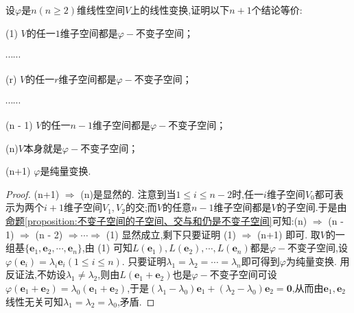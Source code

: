 \documentclass[../../main.tex]{subfiles}%
\begin{document}
\begin{proposition}\label{proposition:纯量变换关于不变子空间的等价条件}
设\(\varphi\)是\(n(n\geqslant  2)\)维线性空间\(V\)上的线性变换,证明以下\(n+1\)个结论等价:

(1) \(V\)的任一\(1\)维子空间都是\(\varphi -\)不变子空间；

\(\cdots\cdots\)

(r) \(V\)的任一\(r\)维子空间都是\(\varphi -\)不变子空间；

\(\cdots\cdots\)

(n - 1) \(V\)的任一\(n - 1\)维子空间都是\(\varphi -\)不变子空间；

(n)\(V\)本身就是\(\varphi -\)不变子空间；

(n+1) \(\varphi\)是纯量变换.
\end{proposition}
\begin{proof}

(n+1) \(\Rightarrow\) (n)是显然的.
注意到当\(1\leqslant  i\leqslant  n - 2\)时,任一\(i\)维子空间\(V_0\)都可表示为两个\(i + 1\)维子空间\(V_1,V_2\)的交;而$V$的任意$n-1$维子空间都是$V$的子空间.于是由\hyperref[proposition:不变子空间的子空间、交与和仍是不变子空间]{命题\ref{proposition:不变子空间的子空间、交与和仍是不变子空间}}可知:(n) \(\Rightarrow\) (n - 1) \(\Rightarrow\) (n - 2) \(\Rightarrow\cdots\Rightarrow\) (1) 显然成立,剩下只要证明 (1) \(\Rightarrow\) (n+1) 即可. 取\(V\)的一组基\(\{\boldsymbol{e}_1,\boldsymbol{e}_2,\cdots,\boldsymbol{e}_n\}\),由 (1) 可知$L\left( \boldsymbol{e}_1 \right) ,L\left( \boldsymbol{e}_2 \right) ,\cdots ,L\left( \boldsymbol{e}_n \right)$都是\(\varphi -\)不变子空间,设\(\varphi(\boldsymbol{e}_i)=\lambda_i\boldsymbol{e}_i(1\leqslant  i\leqslant  n)\). 只要证明\(\lambda_1=\lambda_2=\cdots=\lambda_n\)即可得到\(\varphi\)为纯量变换. 用反证法,不妨设\(\lambda_1\neq\lambda_2\),则由\(L(\boldsymbol{e}_1+\boldsymbol{e}_2)\)也是\(\varphi -\)不变子空间可设\(\varphi(\boldsymbol{e}_1+\boldsymbol{e}_2)=\lambda_0(\boldsymbol{e}_1+\boldsymbol{e}_2)\),于是\((\lambda_1 - \lambda_0)\boldsymbol{e}_1+(\lambda_2 - \lambda_0)\boldsymbol{e}_2=\boldsymbol{0}\),从而由$\boldsymbol{e}_1,\boldsymbol{e}_2$线性无关可知\(\lambda_1=\lambda_2=\lambda_0\),矛盾.

\end{proof}
\end{document}
